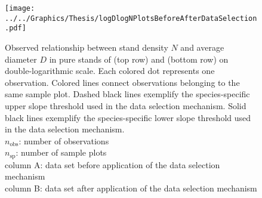 
\begin{figure}[H]
  \centering
  \texttt{[image: ../../Graphics/Thesis/logDlogNPlotsBeforeAfterDataSelection.pdf]}
  \caption{Observed relationship between stand density \(N\) and average diameter \(D\) in pure stands of \Beech{} (top row) and \Spruce{} (bottom row) on double-logarithmic scale.  Each colored dot represents one observation.  Colored lines connect observations belonging to the same sample plot.  Dashed black lines exemplify the species-specific upper slope threshold used in the data selection mechanism.  Solid black lines exemplify the species-specific lower slope threshold used in the data selection mechanism.  \\
    \(n_{\text{obs}}\): number of observations \\
    \(n_{\text{sp}}\): number of sample plots \\
    column A: data set before application of the data selection mechanism \\
    column B: data set after application of the data selection mechanism}
  \label{fig:logDlogNPlotsBeforeAfterDataSelection}
\end{figure}


